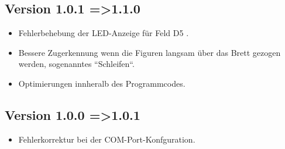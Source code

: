 \documentclass[11pt,a4paper]{article}
\begin{document}
\subsection{Version 1.0.1 =\textgreater 1.1.0}
\begin{itemize}
	\item Fehlerbehebung der LED-Anzeige für Feld D5 .
    \item Bessere Zugerkennung wenn die Figuren langsam über das Brett gezogen werden, sogenanntes ``Schleifen``.
    \item Optimierungen innheralb des Programmcodes.
\end{itemize}
\subsection{Version 1.0.0 =\textgreater 1.0.1}
\begin{itemize}
	\item Fehlerkorrektur bei der COM-Port-Konfguration.
\end{itemize}
\end{document}
